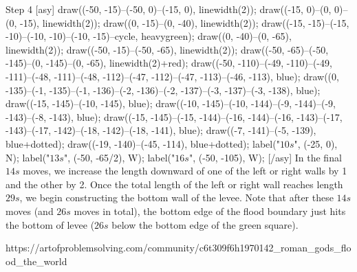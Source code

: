 \documentclass[a4paper]{article}
\begin{document}
\begin{question*}{}
{        

        Step 4
        [asy] draw((-50, -15)--(-50, 0)--(-15, 0), linewidth(2)); draw((-15, 0)--(0, 0)--(0, -15), linewidth(2)); draw((0, -15)--(0, -40), linewidth(2)); draw((-15, -15)--(-15, -10)--(-10, -10)--(-10, -15)--cycle, heavygreen); draw((0, -40)--(0, -65), linewidth(2)); draw((-50, -15)--(-50, -65), linewidth(2)); draw((-50, -65)--(-50, -145)--(0, -145)--(0, -65), linewidth(2)+red); draw((-50, -110)--(-49, -110)--(-49, -111)--(-48, -111)--(-48, -112)--(-47, -112)--(-47, -113)--(-46, -113), blue); draw((0, -135)--(-1, -135)--(-1, -136)--(-2, -136)--(-2, -137)--(-3, -137)--(-3, -138), blue); draw((-15, -145)--(-10, -145), blue); draw((-10, -145)--(-10, -144)--(-9, -144)--(-9, -143)--(-8, -143), blue); draw((-15, -145)--(-15, -144)--(-16, -144)--(-16, -143)--(-17, -143)--(-17, -142)--(-18, -142)--(-18, -141), blue); draw((-7, -141)--(-5, -139), blue+dotted); draw((-19, -140)--(-45, -114), blue+dotted); label("$10s$", (-25, 0), N); label("$13s$", (-50, -65/2), W); label("$16s$", (-50, -105), W); [/asy]
        In the final $14s$ moves, we increase the length downward of one of the left or right walls by 1 and the other by 2. Once the total length of the left or right wall reaches length $29s$, we begin constructing the bottom wall of the levee. Note that after these $14s$ moves (and $26s$ moves in total), the bottom edge of the flood boundary just hits the bottom of levee ($26s$ below the bottom edge of the green square).
        }{%
        https://artofproblemsolving.com/community/c6t309f6h1970142_roman_gods_flood_the_world

}
\end{question*}
\end{document}
